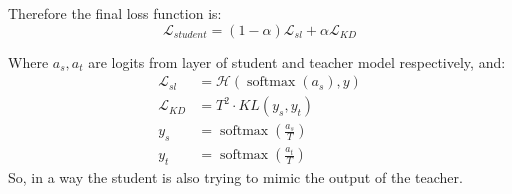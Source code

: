 \documentclass{article} %
\begin{document}
	Therefore the final loss function is: 
	\begin{equation}\label{eq:kd}
		\mathcal{L}_{student} = (1 - \alpha)\mathcal{L}_{sl} + \alpha\mathcal{L}_{KD} 
	\end{equation}
	
	Where $a_s, a_t$ are logits from layer of student and teacher model respectively, and: 
	\begin{equation} 
		\begin{aligned}
			\mathcal{L}_{sl} &= \mathcal{H}\left(\operatorname{softmax}\left(a_{s}\right), y\right) \\
			\mathcal{L}_{KD} &= T^{2} \cdot K L\left(y_{s}, y_{t}\right) \\
			y_{s} &= \operatorname{softmax}\left(\frac{a_{s}}{T}\right) \\
			y_{t} &= \operatorname{softmax}\left(\frac{a_{t}}{T}\right) 
		\end{aligned}
	\end{equation}
	So, in a way the student is also trying to mimic the output of the teacher.
	
\end{document}
